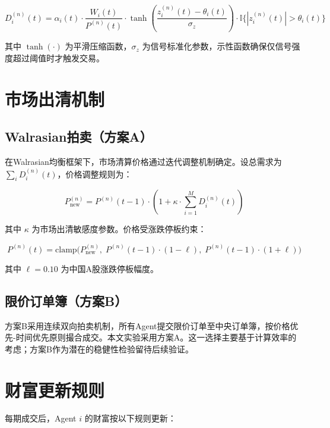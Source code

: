 \begin{equation}
D_i^{(n)}(t) = \alpha_i(t) \cdot \frac{W_i(t)}{P^{(n)}(t)} \cdot \tanh\left(\frac{z_i^{(n)}(t) - \theta_i(t)}{\sigma_z}\right) \cdot \mathbb{I}\{|z_i^{(n)}(t)| > \theta_i(t)\}
\label{eq:demand}
\end{equation}

其中 $\tanh(\cdot)$ 为平滑压缩函数，$\sigma_z$ 为信号标准化参数，示性函数确保仅信号强度超过阈值时才触发交易。

\section{市场出清机制}

\subsection{Walrasian拍卖（方案A）}

在Walrasian均衡框架下，市场清算价格通过迭代调整机制确定。设总需求为 $\sum_i D_i^{(n)}(t)$，价格调整规则为：

\begin{equation}
P^{(n)}_{\text{new}} = P^{(n)}(t-1) \cdot \left(1 + \kappa \cdot \sum_{i=1}^{M} D_i^{(n)}(t)\right)
\label{eq:walrasian}
\end{equation}

其中 $\kappa$ 为市场出清敏感度参数。价格受涨跌停板约束：

\begin{equation}
P^{(n)}(t) = \text{clamp}\bigl(P^{(n)}_{\text{new}},\; P^{(n)}(t-1) \cdot (1-\ell),\; P^{(n)}(t-1) \cdot (1+\ell)\bigr)
\label{eq:price_limit}
\end{equation}

其中 $\ell = 0.10$ 为中国A股涨跌停板幅度。

\subsection{限价订单簿（方案B）}

方案B采用连续双向拍卖机制，所有Agent提交限价订单至中央订单簿，按价格优先-时间优先原则撮合成交。本文实验采用方案A。这一选择主要基于计算效率的考虑；方案B作为潜在的稳健性检验留待后续验证。

\section{财富更新规则}

每期成交后，Agent $i$ 的财富按以下规则更新：

